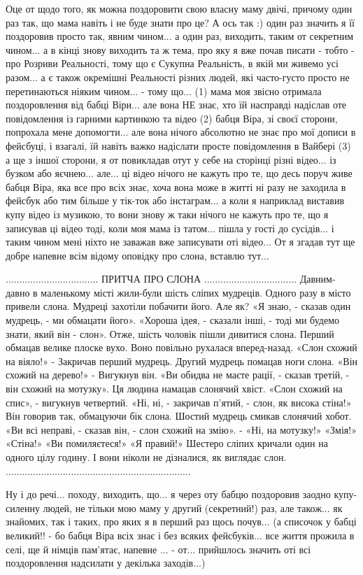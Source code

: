 Оце от щодо того, як можна поздоровити свою власну маму двічі, причому один раз
так, що мама навіть і не буде знати про це? А ось так :) один раз значить я її
поздоровив просто так, явним чином...  а один раз, виходить, таким от секретним
чином... а в кінці знову виходить та ж тема, про яку я вже почав писати - тобто
- про Розриви Реальності, тому що є Сукупна Реальність, в якій ми живемо усі
разом... а є також окремішні Реальності різних людей, які часто-густо просто не
перетинаються ніяким чином... - тому що... (1) мама моя звісно отримала
поздоровлення від бабці Віри... але вона НЕ знає, хто їй насправді надіслав оте
повідомлення із гарними картинкою та відео (2) бабця Віра, зі своєї сторони,
попрохала мене допомогти... але вона нічого абсолютно не знає про мої дописи в
фейсбуці, і взагалі, їй навіть важко надіслати просте повідомлення в Вайбері
(3) а ще з іншої сторони, я от повикладав отут у себе на сторінці різні
відео... із бузком або яєчнею... але...  ці відео нічого не кажуть про те, що
десь поруч живе бабця Віра, яка все про всіх знає, хоча вона може в житті ні
разу не заходила в фейсбук або тим більше у тік-ток або інстаграм... а коли я
наприклад виставив купу відео із музикою, то вони знову ж таки нічого не кажуть
про те, що я записував ці відео тоді, коли моя мама із татом... пішла у гості
до сусідів...  і таким чином мені ніхто не заважав вже записувати оті відео...
От я згадав тут ще добре напевне всім відому оповідку про слона, вставлю тут...

.................................. ПРИТЧА ПРО СЛОНА ..................................  
Давним-давно в маленькому місті жили-були
шість сліпих мудреців. Одного разу в місто привели слона. Мудреці захотіли
побачити його. Але як? «Я знаю, - сказав один мудрець, - ми обмацати його».
«Хороша ідея, - сказали інші, - тоді ми будемо знати, який він - слон». Отже,
шість чоловік пішли дивитися слона. Перший обмацав велике плоске вухо. Воно
повільно рухалася вперед-назад. «Слон схожий на віяло!» - Закричав перший
мудрець. Другий мудрець помацав ноги слона. «Він схожий на дерево!» - Вигукнув
він. «Ви обидва не маєте рації, - сказав третій, - він схожий на мотузку». Ця
людина намацав слонячий хвіст. «Слон схожий на спис», - вигукнув четвертий.
«Ні, ні, - закричав п'ятий, - слон, як висока стіна!» Він говорив так,
обмацуючи бік слона. Шостий мудрець смикав слонячий хобот. «Ви всі неправі, -
сказав він, - слон схожий на змію». - «Ні, на мотузку!» «Змія!» «Стіна!» «Ви
помиляєтеся!» «Я правий!» Шестеро сліпих кричали один на одного цілу годину. І
вони ніколи не дізналися, як виглядає слон.
....................................................................

Ну і до речі... походу, виходить, що... я через оту бабцю поздоровив заодно
купу-силенну людей, не тільки мою маму у другий (секретний!) раз, але також... як
знайомих, так і таких,  про яких я в перший раз щось почув...  (а списочок у
бабці великий!! - бо бабця Віра всіх знає і без всяких фейсбуків... все життя
прожила в селі, ще й німців пам'ятає, напевне ... - от... прийшлось значить оті
всі поздоровлення надсилати у декілька заходів...)



